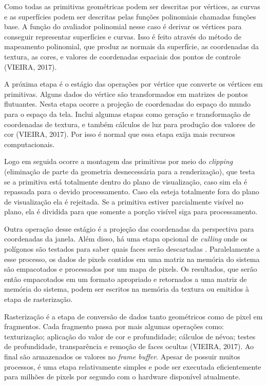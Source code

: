 Como todas as primitivas geométricas podem ser descritas por vértices, as curvas e as superfícies podem ser descritas pelas funções polinomiais chamadas funções base. A função do avaliador polinomial nesse caso é derivar os vértices para conseguir representar superfícies e curvas. Isso é feito através do método de mapeamento polinomial, que produz as normais da superfície, as coordenadas da textura, as cores, e valores de coordenadas espaciais dos pontos de controle (VIEIRA, 2017)\nocite{pipelnRef}.

A próxima etapa é o estágio das operações por vértice que converte os vértices em primitivas. Alguns dados do vértice são transformados em matrizes de pontos flutuantes. Nesta etapa ocorre a projeção de coordenadas do espaço do mundo para o espaço da tela. Inclui algumas etapas como geração e transformação de coordenadas de textura, e também cálculos de luz para produção dos valores de cor (VIEIRA, 2017). Por isso é normal que essa etapa exija mais recursos computacionais. 

Logo em seguida ocorre a montagem das primitivas por meio do \textit{clipping} (eliminação de parte da geometria desnecessária para a renderização), que testa se a primitiva está totalmente dentro do plano de visualização, caso sim ela é repassada para o devido processamento. Caso ela esteja totalmente fora do plano de visualização ela é rejeitada. Se a primitiva estiver parcialmente visível no plano, ela é dividida para que somente a porção visível siga para processamento.

Outra operação desse estágio é a projeção das coordenadas da perspectiva para coordenadas da janela. Além disso, há uma etapa opcional de \textit{culling} onde os polígonos são testados para saber quais faces serão descartadas \cite{GLSLBook}. Paralelamente a esse processo, os dados de pixels contidos em uma matriz na memória do sistema são empacotados e processados por um mapa de pixels. Os resultados, que serão então empacotados em um formato apropriado e retornados a uma matriz de memória do sistema, podem ser escritos na memória da textura ou emitidos à etapa de rasterização.

Rasterização é a etapa de conversão de dados tanto geométricos como de pixel em fragmentos. Cada fragmento passa por mais algumas operações como: texturização; aplicação do valor de cor e profundidade; cálculos de névoa; testes de profundidade, transparência e remoção de faces ocultas (VIEIRA, 2017). Ao final são armazenados os valores no \textit{frame buffer}. Apesar de possuir muitos processos, é uma etapa relativamente simples e pode ser executada eficientemente para milhões de pixels por segundo com o hardware disponível atualmente.

